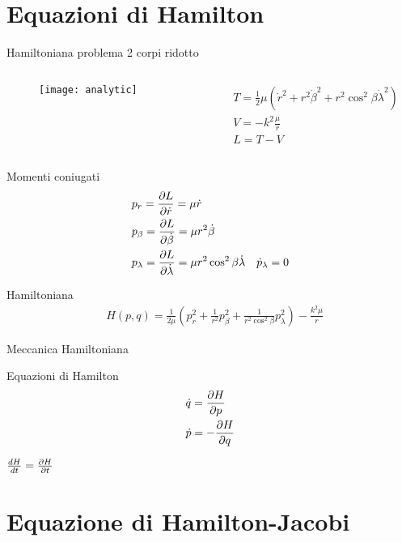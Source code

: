 \section{Equazioni di Hamilton}
\begin{frame}{Hamiltoniana problema 2 corpi ridotto}
\begin{columns}
\begin{column}{0.2\textwidth}
\begin{figure}[!ht]
\texttt{[image: analytic]}
\end{figure}
\end{column}
\begin{column}{0.8\textwidth}
\begin{align*}
&T=\frac{1}{2}\mu(\dot{r}^2+r^2\dot{\beta}^2+r^2\cos^2{\beta}\dot{\lambda}^2)\\
&V=-k^2\frac{\mu}{r}\\
&L=T-V
\end{align*}
\end{column}
\end{columns}
\begin{block}{Momenti coniugati}
\begin{align*}
&p_r=\PDy{\dot{r}}{L}=\mu\dot{r}\\
&p_{\beta}=\PDy{\dot{\beta}}{L}=\mu r^2\dot{\beta}\\
&p_{\lambda}=\PDy{\dot{\lambda}}{L}=\mu r^2\cos^2{\beta}\dot{\lambda}\quad \dot{p}_{\lambda}=0
\end{align*}
\end{block}
\begin{block}{Hamiltoniana}
\begin{align*}
&H(p,q)=\frac{1}{2\mu}(p_r^2+\frac{1}{r^2}p_{\beta}^2+\frac{1}{r^2\cos^2{\beta}}p_{\lambda}^2)-\frac{k^2\mu}{r}
\end{align*}
\end{block}
\end{frame}

\begin{wordonframe}{Meccanica Hamiltoniana}
\begin{block}{Equazioni di Hamilton}
\begin{align*}
&\dot{q}=\PDy{p}{H}\\
&\dot{p}=-\PDy{q}{H}
\end{align*}
\end{block}
$\TDy{t}{H}=\PDy{t}{H}$
\end{wordonframe}

\section{Equazione di Hamilton-Jacobi}

